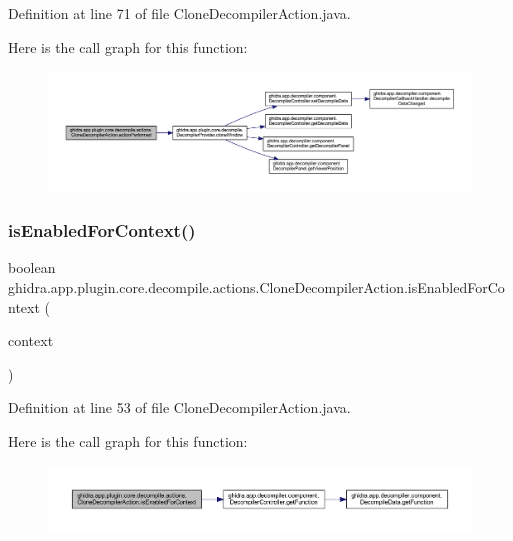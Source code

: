 Definition at line 71 of file Clone\+Decompiler\+Action.\+java.

Here is the call graph for this function\+:
\nopagebreak
\begin{figure}[H]
\begin{center}
\leavevmode
\includegraphics[width=350pt]{classghidra_1_1app_1_1plugin_1_1core_1_1decompile_1_1actions_1_1_clone_decompiler_action_ac35526e35fa9299322a15ad33eeba884_cgraph}
\end{center}
\end{figure}
\mbox{\label{classghidra_1_1app_1_1plugin_1_1core_1_1decompile_1_1actions_1_1_clone_decompiler_action_a71515c218c910412ba3e6ffe04db5df9}} 
\subsubsection{\texorpdfstring{isEnabledForContext()}{isEnabledForContext()}}
{\footnotesize\ttfamily boolean ghidra.\+app.\+plugin.\+core.\+decompile.\+actions.\+Clone\+Decompiler\+Action.\+is\+Enabled\+For\+Context (\begin{DoxyParamCaption}\item[{Action\+Context}]{context }\end{DoxyParamCaption})\hspace{0.3cm}{\ttfamily [inline]}}



Definition at line 53 of file Clone\+Decompiler\+Action.\+java.

Here is the call graph for this function\+:
\nopagebreak
\begin{figure}[H]
\begin{center}
\leavevmode
\includegraphics[width=350pt]{classghidra_1_1app_1_1plugin_1_1core_1_1decompile_1_1actions_1_1_clone_decompiler_action_a71515c218c910412ba3e6ffe04db5df9_cgraph}
\end{center}
\end{figure}



